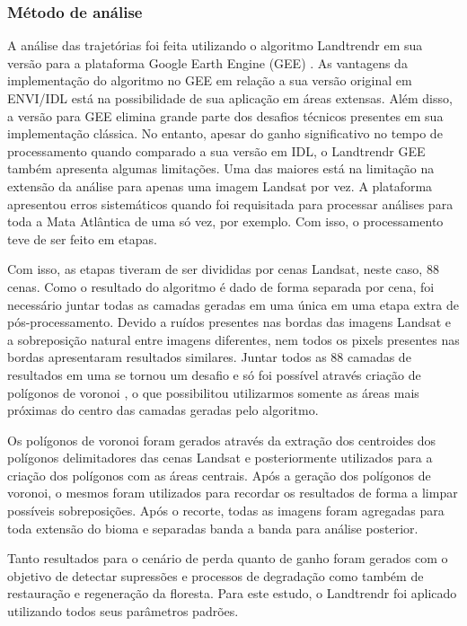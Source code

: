 \documentclass[12pt,a4paper]{article}
\begin{document}
\subsubsection{Método de análise}
\hspace{13pt} A análise das trajetórias foi feita utilizando o algoritmo Landtrendr em sua versão para a plataforma Google Earth Engine (GEE) \citep{Kennedy2018}. As vantagens da implementação do algoritmo no GEE em relação a sua versão original em ENVI/IDL está na possibilidade de sua aplicação em áreas extensas. Além disso, a versão para GEE elimina grande parte dos desafios técnicos presentes em sua implementação clássica. No entanto, apesar do ganho significativo no tempo de processamento quando comparado a sua versão em IDL, o Landtrendr GEE também apresenta algumas limitações. Uma das maiores está na limitação na extensão da análise para apenas uma imagem Landsat por vez. A plataforma apresentou erros sistemáticos quando foi requisitada para processar análises para toda a Mata Atlântica de uma só vez, por exemplo. Com isso, o processamento teve de ser feito em etapas. 

Com isso, as etapas tiveram de ser divididas por cenas Landsat, neste caso, 88 cenas. Como o resultado do algoritmo é dado de forma separada por cena, foi necessário juntar todas as camadas geradas em uma única em uma etapa extra de pós-processamento. Devido a ruídos presentes nas bordas das imagens Landsat e a sobreposição natural entre imagens diferentes, nem todos os pixels presentes nas bordas apresentaram resultados similares. Juntar todos as 88 camadas de resultados em uma se tornou um desafio e só foi possível através criação de polígonos de voronoi \citep{Okabe}, o que possibilitou utilizarmos somente as áreas mais próximas do centro das camadas geradas pelo algoritmo. 

Os polígonos de voronoi foram gerados através da extração dos centroides dos polígonos delimitadores das cenas Landsat e posteriormente utilizados para a criação dos polígonos com as áreas centrais. Após a geração dos polígonos de voronoi, o mesmos foram utilizados para recordar os resultados de forma a limpar possíveis sobreposições. Após o recorte, todas as imagens foram agregadas para toda extensão do bioma e separadas banda a banda para análise posterior.


Tanto resultados para o cenário de perda quanto de ganho foram gerados com o objetivo de detectar supressões e processos de degradação como também de restauração e regeneração da floresta. Para este estudo, o Landtrendr foi aplicado utilizando todos seus parâmetros padrões.
\end{document}
